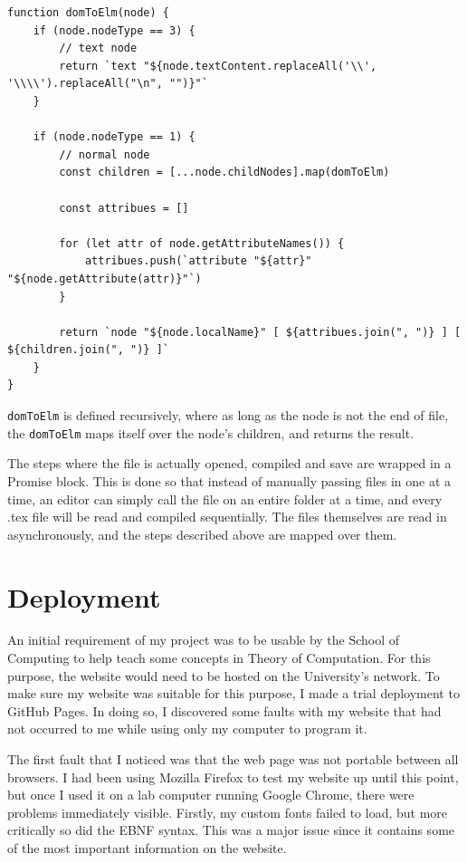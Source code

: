 \documentclass{l4proj}
\begin{document}
\begin{lstlisting}
function domToElm(node) {
    if (node.nodeType == 3) {
        // text node
        return `text "${node.textContent.replaceAll('\\', '\\\\').replaceAll("\n", "")}"`
    }

    if (node.nodeType == 1) {
        // normal node
        const children = [...node.childNodes].map(domToElm)

        const attribues = []

        for (let attr of node.getAttributeNames()) {
            attribues.push(`attribute "${attr}" "${node.getAttribute(attr)}"`)
        }

        return `node "${node.localName}" [ ${attribues.join(", ")} ] [ ${children.join(", ")} ]`
    }
}
\end{lstlisting}

\texttt{domToElm} is defined recursively, where as long as the node is not the end of file, the \texttt{domToElm} maps itself over the node's children, and returns the result.

The steps where the file is actually opened, compiled and save are wrapped in a Promise block. This is done so that instead of manually passing files in one at a time, an editor can simply call the file on an entire folder at a time, and every .tex file will be read and compiled sequentially.  The files themselves are read in asynchronously, and the steps described above are mapped over them.

\section{Deployment}

An initial requirement of my project was to be usable by the School of Computing to help teach some concepts in Theory of Computation.  For this purpose, the website would need to be hosted on the University's network.  To make sure my website was suitable for this purpose, I made a trial deployment to GitHub Pages.  In doing so, I discovered some faults with my website that had not occurred to me while using only my computer to program it.

The first fault that I noticed was that the web page was not portable between all browsers.  I had been using Mozilla Firefox to test my website up until this point, but once I used it on a lab computer running Google Chrome, there were problems immediately visible.  Firstly, my custom fonts failed to load, but more critically so did the EBNF syntax.  This was a major issue since it contains some of the most important information on the website.
\end{document}

